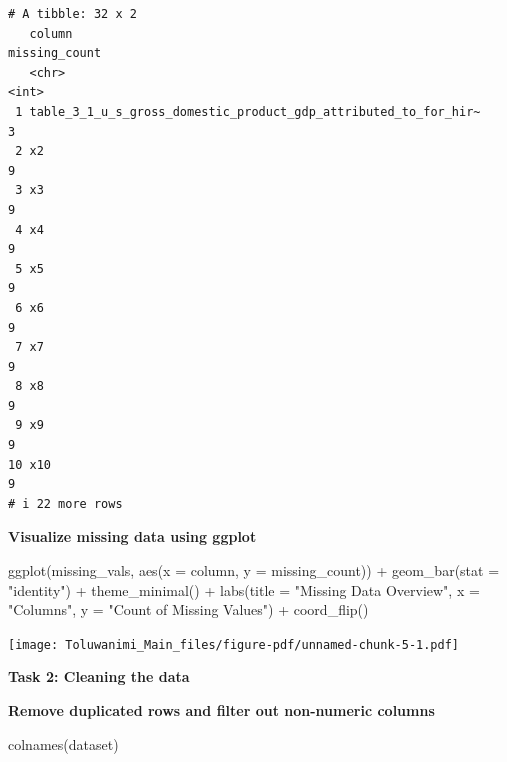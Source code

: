 \documentclass[
  letterpaper,
  DIV=11,
  numbers=noendperiod]{scrreprt}
\newenvironment{Shaded}{\begin{snugshade}}{\end{snugshade}}
\newcommand{\AttributeTok}[1]{\textcolor[rgb]{0.40,0.45,0.13}{#1}}
\newcommand{\FunctionTok}[1]{\textcolor[rgb]{0.28,0.35,0.67}{#1}}
\newcommand{\NormalTok}[1]{\textcolor[rgb]{0.00,0.23,0.31}{#1}}
\newcommand{\SpecialCharTok}[1]{\textcolor[rgb]{0.37,0.37,0.37}{#1}}
\newcommand{\StringTok}[1]{\textcolor[rgb]{0.13,0.47,0.30}{#1}}
\begin{document}
\begin{verbatim}
# A tibble: 32 x 2
   column                                                          missing_count
   <chr>                                                                   <int>
 1 table_3_1_u_s_gross_domestic_product_gdp_attributed_to_for_hir~             3
 2 x2                                                                          9
 3 x3                                                                          9
 4 x4                                                                          9
 5 x5                                                                          9
 6 x6                                                                          9
 7 x7                                                                          9
 8 x8                                                                          9
 9 x9                                                                          9
10 x10                                                                         9
# i 22 more rows
\end{verbatim}

\textbf{Visualize missing data using ggplot}

\begin{Shaded}
\begin{Highlighting}[]
\FunctionTok{ggplot}\NormalTok{(missing\_vals, }\FunctionTok{aes}\NormalTok{(}\AttributeTok{x =}\NormalTok{ column, }\AttributeTok{y =}\NormalTok{ missing\_count)) }\SpecialCharTok{+}
  \FunctionTok{geom\_bar}\NormalTok{(}\AttributeTok{stat =} \StringTok{"identity"}\NormalTok{) }\SpecialCharTok{+}
  \FunctionTok{theme\_minimal}\NormalTok{() }\SpecialCharTok{+}
  \FunctionTok{labs}\NormalTok{(}\AttributeTok{title =} \StringTok{"Missing Data Overview"}\NormalTok{, }\AttributeTok{x =} \StringTok{"Columns"}\NormalTok{, }\AttributeTok{y =} \StringTok{"Count of Missing Values"}\NormalTok{) }\SpecialCharTok{+}
  \FunctionTok{coord\_flip}\NormalTok{()}
\end{Highlighting}
\end{Shaded}

\texttt{[image: Toluwanimi\_Main\_files/figure-pdf/unnamed-chunk-5-1.pdf]}

\textbf{Task 2: Cleaning the data}

\textbf{Remove duplicated rows and filter out non-numeric columns}

\begin{Shaded}
\begin{Highlighting}[]
\FunctionTok{colnames}\NormalTok{(dataset)}
\end{Highlighting}
\end{Shaded}
\end{document}
